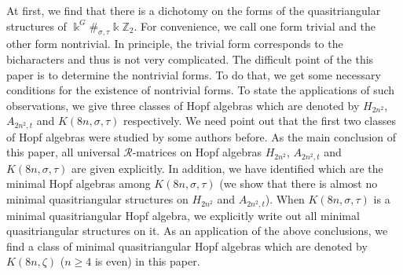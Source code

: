 \documentclass[a4paper,11pt]{amsart}
\numberwithin{equation}{section}
\begin{document}
At first, we find that there is a dichotomy on the forms of the quasitriangular structures of $\Bbbk^G\#_{\sigma,\tau}\Bbbk \mathbb{Z}_{2}$. For convenience, we call one form trivial and the other form nontrivial. In principle, the trivial form corresponds to the bicharacters and thus is not very complicated. The difficult point of the this paper is to determine the nontrivial forms. To do that, we get some necessary conditions for the existence of nontrivial forms.  To state the applications of such observations, we give three classes of Hopf algebras which are denoted by $H_{2n^2}$, $A_{2n^2,t}$ and $K(8n,\sigma,\tau)$ respectively. We need point out that the first two classes of Hopf algebras were studied by some authors \cite{D,M2} before. As the main conclusion of this paper,  all universal $\mathcal{R}$-matrices on Hopf algebras $H_{2n^2}$, $A_{2n^2,t}$ and $K(8n,\sigma,\tau)$ are given explicitly.  In addition,  we have identified which are the minimal Hopf algebras among $K(8n,\sigma,\tau)$ (we show that there is almost no minimal quasitriangular structures on $H_{2n^2}$ and $A_{2n^2,t}$). When $K(8n,\sigma,\tau)$ is a minimal quasitriangular Hopf algebra, we explicitly write out all minimal quasitriangular structures on it. As an application of the above conclusions, we find a class of minimal quasitriangular Hopf algebras which are denoted by $K(8n,\zeta)$ ($n\geq 4$ is even) in this paper.
%
\end{document}
